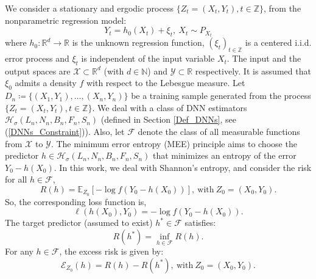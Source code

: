\documentclass[10pt,twoside]{article}
\numberwithin{equation}{section}
\newcommand{\E}{\ensuremath{\mathbb{E}}}
\newcommand{\R}{\ensuremath{\mathbb{R}}}
\newcommand{\Z}{\ensuremath{\mathbb{Z}}}
\newcommand{\N}{\ensuremath{\mathbb{N}}}
\begin{document}
We consider a stationary and ergodic process $\{Z_t =(X_t, Y_t), t \in \Z \} $, from the nonparametric regression model:
% 
\begin{equation}\label{equa_model_reg}
Y_t = h_0(X_t) + \xi_t, ~ X_t \sim P_{X_t}
\end{equation}
%
where $h_0 : \R ^d \to \R$ is the unknown regression function, $(\xi_t)_{t \in \Z}$ is a centered i.i.d. error process and $\xi_t$ is independent of the input variable $X_t$.
The input and the output spaces are $\mathcal{X} \subset \R^d $ (with $d \in \N$) and $\mathcal{Y}  \subset \R$ respectively.
It is assumed that $\xi_0$ admits a density $f$ with respect to the Lebesgue measure.
Let $ D_n \coloneqq  \{ (X_1, Y_1), \dots, (X_n, Y_n) \}$ be a training sample generated from the process $\{Z_t =(X_t, Y_t), t \in \Z \} $.  
%
We deal with a class of DNN estimators $\mathcal{H}_{\sigma}(L_n, N_n, B_n, F_n, S_n)$ (defined in Section \ref{Def_DNNs}, see (\ref{DNNs_Constraint})).
%
Also, let $\mathcal{F}$ denote the class of all measurable functions from $\mathcal{X}$ to $\mathcal{Y}$. 
%
The minimum error entropy (MEE) principle aims to choose the predictor $h \in \mathcal{H}_{\sigma}(L_n, N_n, B_n, F_n, S_n)$ that minimizes an entropy of the error $Y_0 - h(X_0)$.
In this work, we deal with Shannon's entropy, and consider the risk for all $h \in \mathcal{F}$,
%
%
\begin{equation}\label{equa_def_risk}
 R(h) = \E_{Z_0} [-\log f(Y_0 - h(X_0))], ~ \text{with}~ Z_0 = (X_0, Y_0).  
\end{equation}
%
So, the corresponding loss function is,
%
\begin{equation}\label{loss_entropy}
\ell(h(X_0), Y_0) = -\log f(Y_0 - h(X_0)).
\end{equation}
%
% 
The target predictor (assumed to exist) $h^{*} \in \mathcal{F} $ satisfies:
%
\begin{equation}\label{best_pred_F}
R(h^{*}) =  \underset{h \in \mathcal{F}}{\inf}R(h).
\end{equation}
%
%
For any $h \in \mathcal{F}$, the excess risk is given by:
%
\begin{equation}\label{equa_excess_risk}
\mathcal{E}_{Z_0}(h) = R(h) - R(h^{*}), ~ \text{with} ~ Z_0 = (X_0, Y_0).
\end{equation}
%
 
\medskip
\end{document}
